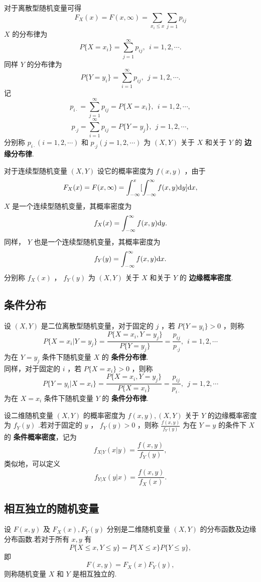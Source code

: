 \documentclass[UTF8,10pt]{ctexart}
\begin{document}
	对于离散型随机变量可得 $$ F_{X}(x)=F(x, \infty )=\sum\limits_{x_{i} \le x}\sum\limits_{j=1}p_{ij} $$ $ X $ 的分布律为 $$ P\{X=x_{i}\}=\sum\limits_{j=1 }^{ \infty }p_{ij},\ \ i=1,2, \cdots . $$ 同样 $ Y $ 的分布律为 $$ P\{Y=y_{i}\}=\sum\limits_{i=1}^{ \infty }p_{ij},\ \ j=1,2, \cdots . $$ 记 $$ p_{i \cdot }=\sum\limits_{j=1}^{ \infty }p_{ij}=P\{X=x_{i}\},\ \ i=1,2, \cdots , $$ $$ p_{ \cdot j}=\sum\limits_{i=1}^{ \infty }p_{ij}=P\{Y=y_{j}\},\ \ j=1,2, \cdots , $$ 分别称 $ p_{i \cdot }(i=1,2, \cdots ) $ 和 $ p_{ \cdot j}(j=1,2, \cdots ) $ 为 $ (X,Y) $ 关于 $ X $ 和关于 $ Y $ 的 \textbf{边缘分布律}.
	
	对于连续型随机变量 $ (X,Y) $ 设它的概率密度为 $ f(x,y) $ ，由于 $$ F_{X}(x)=F(x, \infty )= \int_{- \infty }^{x}[ \int_{- \infty }^{ \infty }f(x,y){\rm d}y ]{\rm d}x, $$ $ X $ 是一个连续型随机变量，其概率密度为 $$ f_{X}(x)= \int_{- \infty }^{ \infty }f(x,y){\rm d}y. $$ 同样， $ Y $ 也是一个连续型随机变量，其概率密度为 $$ f_{Y}(y)= \int_{- \infty }^{ \infty }f(x,y){\rm d}x. $$ 分别称 $ f_X(x) $ ， $ f_{Y}(y) $ 为 $ (X,Y) $ 关于 $ X $ 和关于 $ Y $ 的 \textbf{边缘概率密度}.
	
	\subsection{条件分布}
	
	设 $ (X,Y) $ 是二位离散型随机变量，对于固定的 $ j $ ，若 $ P\{Y=y_{i}\}>0 $ ，则称 $$ P\{X=x_{i}|Y=y_{j}\}= \frac{P\{X=x_{i},Y=y_{j}\}}{P\{Y=y_{j}\}}= \frac{p_{ij}}{p_{ \cdot j}},\ \ i=1,2, \cdots $$ 为在 $ Y=y_{j} $ 条件下随机变量 $ X $ 的 \textbf{条件分布律}. \\ 
	同样，对于固定的 $ i $ ，若 $ P\{X=x_{i}\}>0 $ ，则称 $$ P\{Y=y_{i}|X=x_{i}\}= \frac{P\{X=x_{i},Y=y_{j}\}}{P\{X=x_{i}\}}= \frac{p_{ij}}{p_{i \cdot }},\ \ j=1,2, \cdots $$ 为在 $ X=x_{i} $ 条件下随机变量 $ Y $ 的 \textbf{条件分布律}.
	
	设二维随机变量 $ (X,Y) $ 的概率密度为 $ f(x,y),(X,Y) $ 关于 $ Y $ 的边缘概率密度为 $ f_{Y}(y) $ .若对于固定的 $ y $ ， $ f_{Y}(y)>0 $ ，则称 $ \frac{f(x,y)}{f_{Y}(y)} $ 为在 $ Y=y $ 的条件下 $ X $ 的 \textbf{条件概率密度}，记为 $$ f_{X|Y}(x|y)= \frac{f(x,y)}{f_{Y}(y)}, $$ 类似地，可以定义 $$ f_{Y|X}(y|x)= \frac{f(x,y)}{f_{X}(x)}. $$
	
	\subsection{相互独立的随机变量}
	
	设 $ F(x,y) $ 及 $ F_{X}(x),F_{Y}(y) $ 分别是二维随机变量 $ (X,Y) $ 的分布函数及边缘分布函数.若对于所有 $ x,y $ 有 $$ P\{X \le x,Y \le y\}=P\{X \le x\}P\{Y \le y\}, $$ 即 $$ F(x,y)=F_{X}(x)F_{Y}(y), $$ 则称随机变量 $ X $ 和 $ Y $ 是相互独立的.
	
\end{document}
